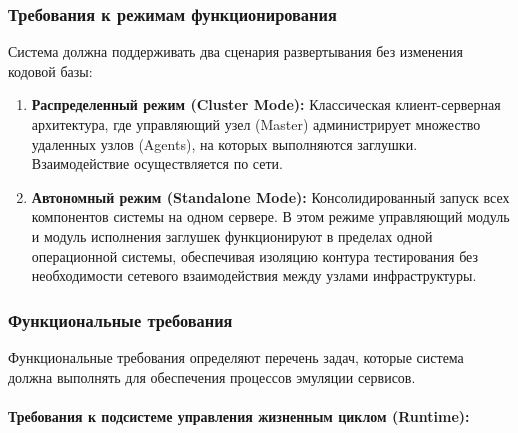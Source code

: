 \documentclass[
]{article}
\begin{document}
\subsubsection{Требования к режимам
функционирования}\label{ux442ux440ux435ux431ux43eux432ux430ux43dux438ux44f-ux43a-ux440ux435ux436ux438ux43cux430ux43c-ux444ux443ux43dux43aux446ux438ux43eux43dux438ux440ux43eux432ux430ux43dux438ux44f}

Система должна поддерживать два сценария развертывания без изменения
кодовой базы:

\begin{enumerate}
\def\labelenumi{\arabic{enumi}.}
\item
  \textbf{Распределенный режим (Cluster Mode):} Классическая
  клиент-серверная архитектура, где управляющий узел (Master)
  администрирует множество удаленных узлов (Agents), на которых
  выполняются заглушки. Взаимодействие осуществляется по сети.
\item
  \textbf{Автономный режим (Standalone Mode):} Консолидированный запуск
  всех компонентов системы на одном сервере. В этом режиме управляющий
  модуль и модуль исполнения заглушек функционируют в пределах одной
  операционной системы, обеспечивая изоляцию контура тестирования без
  необходимости сетевого взаимодействия между узлами инфраструктуры.
\end{enumerate}

\subsubsection{Функциональные
требования}\label{ux444ux443ux43dux43aux446ux438ux43eux43dux430ux43bux44cux43dux44bux435-ux442ux440ux435ux431ux43eux432ux430ux43dux438ux44f}

Функциональные требования определяют перечень задач, которые система
должна выполнять для обеспечения процессов эмуляции сервисов.

\paragraph{Требования к подсистеме управления жизненным циклом
(Runtime):}\label{ux442ux440ux435ux431ux43eux432ux430ux43dux438ux44f-ux43a-ux43fux43eux434ux441ux438ux441ux442ux435ux43cux435-ux443ux43fux440ux430ux432ux43bux435ux43dux438ux44f-ux436ux438ux437ux43dux435ux43dux43dux44bux43c-ux446ux438ux43aux43bux43eux43c-runtime}
\end{document}
